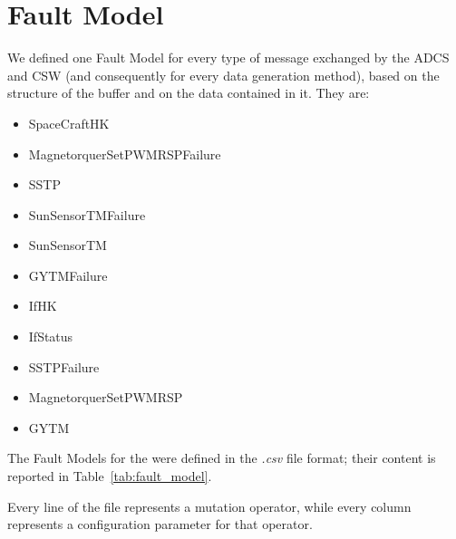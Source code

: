 \section{Fault Model}
We defined one Fault Model for every type of message exchanged by the ADCS and CSW (and consequently for every data generation method), based on the structure of the buffer and on the data contained in it.
They are:
\begin{itemize}
\item SpaceCraftHK
\item MagnetorquerSetPWMRSPFailure
\item SSTP
\item SunSensorTMFailure
\item SunSensorTM
\item GYTMFailure
\item IfHK
\item IfStatus
\item SSTPFailure
\item MagnetorquerSetPWMRSP
\item GYTM
\end{itemize}

The Fault Models for the \case were defined in the \emph{.csv} file format; their content is reported in Table~\ref{tab:fault_model}.




Every line of the file represents a mutation operator, while every column represents a configuration parameter for that operator.


